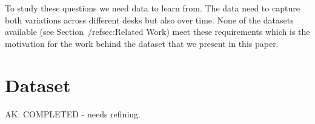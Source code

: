 \documentclass[letterpaper, 10 pt, conference]{ieeeconf}  %
\begin{document}
To study these questions we need data to learn from. The data need to capture both variations across different desks but also over time. 
None of the datasets available (see Section~/ref{sec:Related Work}) meet these requirements which is the motivation for the work behind the 
dataset that we present in this paper.


\section{Dataset}
\label{sec:Dataset}


{\color{blue} AK: COMPLETED - needs refining.}
\end{document}
